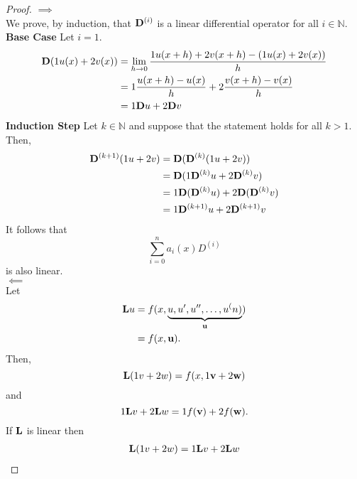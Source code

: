 \begin{proof}\(\implies\)\\
	We prove, by induction, that \(\mathrm{\bf{D}}^{(i)}\) is a linear differential operator for all \(i \in \mathbb{N}\).\\
	\textbf{Base Case} Let \(i=1\).\\
	\begin{equation}
		\begin{split}
			\mathrm{\bf{D}} (1 u(x) + 2 v(x)) &= \lim_{h\to 0} \frac{1 u(x+h) + 2 v(x+h)-(1 u(x) + 2 v(x))}{h}\\
			&=1 \frac{u(x+h) - u(x)}{h} + 2 \frac{v(x+h)-v(x)}{h}\\
			&= 1 \mathrm{\bf{D}} u + 2 \mathrm{\bf{D}} v
		\end{split}
	\end{equation}
	\textbf{Induction Step} Let \(k \in \mathbb{N}\) and suppose that the statement holds for all \(k>1\). Then,
	\begin{equation}
		\begin{split}
			\mathrm{\bf{D}}^{(k+1)} (1 u + 2 v) &= \mathrm{\bf{D}} ( \mathrm{\bf{D}}^{(k)}(1 u + 2 v))\\
			&=\mathrm{\bf{D}}(1 \mathrm{\bf{D}}^{(k)} u + 2 \mathrm{\bf{D}}^{(k)} v)\\
			&=1 \mathrm{\bf{D}}(\mathrm{\bf{D}}^{(k)} u) + 2 \mathrm{\bf{D}} (\mathrm{\bf{D}}^{(k)} v)\\
			&= 1 \mathrm{\bf{D}}^{(k+1)} u + 2 \mathrm{\bf{D}}^{(k+1)} v
		\end{split}
	\end{equation}
	It follows that 
	\begin{equation}
		\sum_{i=0}^{n} a_i(x) D^{(i)}
	\end{equation}
	is also linear.\\
	\(\impliedby\)\\
	Let
	\begin{equation}
		\begin{split}
			\mathrm{\bf{L}} u &= f(x, \underbrace{u, u', u'', \dots, u^(n)}_{\textbf{u}})\\
			&=f(x, \textbf{u}).
		\end{split}
	\end{equation}
	Then,
	\begin{equation}
		\mathrm{\bf{L}} (1 v + 2 w) = f(x, 1 \textbf{v} + 2 \textbf{w})
	\end{equation}
	and
	\begin{equation}
		1 \mathrm{\bf{L}} v + 2 \mathrm{\bf{L}} w = 1 f(\textbf{v}) + 2 f(\textbf{w}).
	\end{equation}
	If \(\mathrm{\bf{L}}\) is linear then 
	\begin{equation}
		\begin{split}
			\L(\a v + \b w) &= \a \L v + \b \L w\\

\end{split}
\end{equation}
\end{proof}

